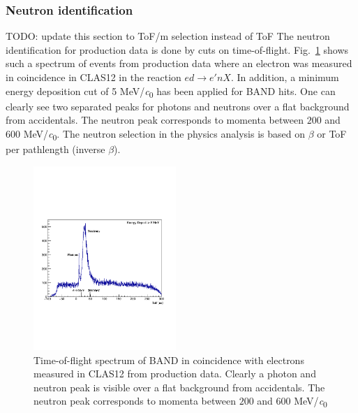 \documentclass[3p,final,twocolumn]{elsarticle}
\begin{document}

\subsubsection{Neutron identification}
\label{sec:neutronidentification}
{\color{red}  TODO: update this section to ToF/m selection instead of ToF}
The neutron identification for production data is done by cuts on time-of-flight. Fig.~\ref{fig:tof} shows such a spectrum of events from production data where an electron was measured in coincidence in CLAS12 in the reaction $ed \rightarrow e'nX$. In addition, a minimum energy deposition cut of 5 \si{\MeV/\clight} has been applied for BAND hits. One can clearly see two separated peaks for photons and neutrons over a flat background from accidentals. The neutron peak corresponds to momenta between $200$ and $600$ \si{\MeV/\clight}.
The neutron selection in the physics analysis is based on $\beta$ or ToF per pathlength (inverse $\beta$).

\begin{figure}[h!]
	\centering
		\includegraphics[width=0.48\textwidth]{tof-labels.pdf}
	\caption{Time-of-flight spectrum of BAND in coincidence with electrons measured in CLAS12 from production data. Clearly a photon and neutron peak is visible over a flat background from accidentals. The neutron peak corresponds to momenta  between $200$ and $600$ \si{\MeV/\clight}}
	\label{fig:tof}
\end{figure}
\end{document}

